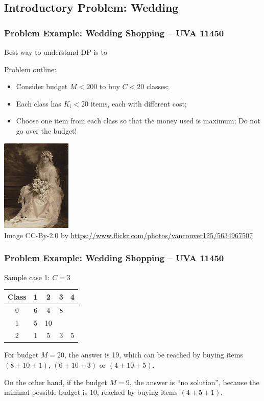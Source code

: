 \documentclass{beamer}
\begin{document}
\subsection{Introductory Problem: Wedding}

\begin{frame}
    \frametitle{Problem Example: Wedding Shopping -- UVA 11450}

    \begin{block}{}
      Best way to understand DP is to 
    \end{block}
    
    Problem outline:
    \begin{itemize}
      \item Consider budget $M < 200$ to buy $C < 20$ classes;
      \item Each class has $K_i < 20$ items, each with different cost;
      \item {} Choose one item from each class so that
        the money used is maximum; \alert{Do not go over the budget!}
    \end{itemize}

    \hfill \includegraphics[width=0.25\textwidth]{../img/weddingdress}\\
    {\tiny
    \hfill Image CC-By-2.0 by \url{https://www.flickr.com/photos/vancouver125/5634967507}}

\end{frame}

\begin{frame}
  \frametitle{Problem Example: Wedding Shopping -- UVA 11450}
  \begin{block}{Sample case 1: $C=3$}
  \begin{tabular}{|c|cccc|}
    Class & 1 & 2 & 3 & 4\\
    \hline
    0 & 6 & 4 & 8 & \\
    1 & 5 & 10 & & \\
    2 & 1 & 5 & 3 & 5\\
  \end{tabular}
  \end{block}

  \medskip

  For budget $M=20$, the answer is \alert{19}, which can be reached by buying items
  $(8+10+1)$, $(6+10+3)$ or $(4+10+5)$.

  \bigskip

  On the other hand, if the budget $M=9$, the answer is ``no
  solution'', because the minimal possible budget is \alert{10},
  reached by buying items $(4+5+1)$.
\end{frame}
\end{document}
